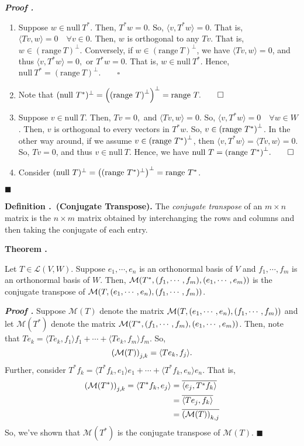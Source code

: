 \documentclass[11pt, letterpaper]{article}
\newcounter{index}[subsection]
\newenvironment*{df}[1]{\par\noindent\textbf{Definition \thesubsection.\stepcounter{index}\theindex\ (#1).}}{\par}
\newenvironment*{thm}[1]{\begin{tcolorbox}\par\noindent\textbf{Theorem \thesubsection.\stepcounter{index}\theindex\ #1} \par}{\par\end{tcolorbox}}
\newcounter{nprf}[subsection]
\newenvironment*{prf}{\par\indent\textbf{\textit{Proof \stepcounter{nprf}\thenprf.}}}{\hfill$\blacksquare$\par}
\def\L{\mathcal{L}}
\def\M{\mathcal{M}}
\def\pqde{\qquad\square}
\def\Null{\mathrm{null\ }}
\def\range{\mathrm{range\ }}
\begin{document}
\begin{prf}
	\begin{enumerate}
		\item Suppose $w\in\Null T^*$. Then, $T^*w=0$. So, $\langle v,T^*w\rangle=0$. That is, $\langle Tv,w\rangle=0\quad\forall v\in0$. Then, $w$ is orthogonal to any $Tv$. That is, $w\in(\range T)^\perp$. Conversely, if $w\in(\range T)^\perp$, we have $\langle Tv,w\rangle=0$, and thus $\langle v,T^*w\rangle=0,$ or $T^*w=0$. That is, $w\in\Null T^*$. Hence, $\Null T^*=(\range T)^\perp.\pqde$
		\item Note that $(\Null T^*)^\perp=\qty(\qty(\range T)^\perp)^\perp=\range T.\pqde$
		\item Suppose $v\in\Null T$. Then, $Tv=0,$ and $\langle Tv,w\rangle=0$. So, $\langle v,T^*w\rangle=0\quad\forall w\in W$. Then, $v$ is orthogonal to every vectors in $T^*w$. So, $v\in\qty(\range T^*)^\perp$. In the other way around, if we assume $v\in\qty(\range T^*)^\perp$, then $\langle v,T^*w\rangle=\langle Tv,w\rangle=0$. So, $Tv=0$, and thus $v\in\Null T$. Hence, we have $\Null T=\qty(\range T^*)^\perp.\pqde$
		\item Consider $(\Null T)^\perp=\qty((\range T^*)^\perp)^\perp=\range T^*$.
	\end{enumerate}	
\end{prf}
\begin{df}{Conjugate Transpose}
	The \textit{conjugate transpose} of an $m\times n$ matrix is the $n\times m$ matrix obtained by interchanging the rows and columns and then taking the conjugate of each entry. 	
\end{df}
\begin{thm}{}
	Let $T\in\L(V,W)$. Suppose $e_1,\cdots,e_n$ is an orthonormal basis of $V$ and $f_1,\cdots,f_m$ is an orthonormal basis of $W$. Then, $\M\qty(T^*,(f_1,\cdots,f_m),(e_1,\cdots,e_m))$ is the conjugate transpose of $\M\qty(T,(e_1,\cdots,e_n),(f_1,\cdots,f_m))$.
\end{thm}
\begin{prf}
	Suppose $\M(T)$ denote the matrix $\M\qty(T,(e_1,\cdots,e_n),(f_1,\cdots,f_m))$ and let $\M(T^*)$ denote the matrix $\M\qty(T^*,(f_1,\cdots,f_m),(e_1,\cdots,e_m))$. Then, note that $Te_k=\langle Te_k,f_1\rangle f_1+\cdots+\langle Te_k,f_m\rangle f_m$. So, \[\qty(\M(T))_{j,k}=\langle Te_k,f_j\rangle.\] Further, consider $T^*f_k=\langle T^*f_k,e_1\rangle e_1+\cdots+\langle T^*f_k,e_n\rangle e_n$. That is, \[\begin{aligned}\qty(\M(T^*))_{j,k}=\langle T^*f_k,e_j\rangle&=\overline{\langle e_j,T^*f_k\rangle}\\&=\overline{\langle Te_j,f_k\rangle}\\&=\overline{\qty(\M(T))_{k,j}}\end{aligned}\] So, we've shown that $\M(T^*)$ is the conjugate transpose of $\M(T)$.
\end{prf}
\end{document}
